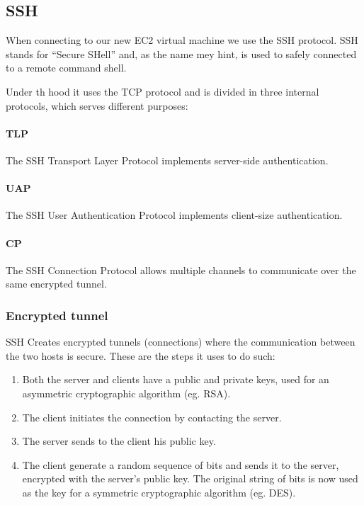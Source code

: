 \subsection{SSH}

When connecting to our new EC2 virtual machine we use the SSH protocol. SSH stands for ``Secure SHell'' and, as the name mey hint, is used to safely connected to a remote command shell.

Under th hood it uses the TCP protocol and is divided in three internal protocols, which serves different purposes:

\paragraph{TLP}
The SSH Transport Layer Protocol implements server-side authentication.

\paragraph{UAP}
The SSH User Authentication Protocol implements client-size authentication.

\paragraph{CP}
The SSH Connection Protocol allows multiple channels to communicate over the same
encrypted tunnel.

\subsubsection{Encrypted tunnel}
SSH Creates encrypted tunnels (connections) where the communication between the two hosts is secure. These are the steps it uses to do such:
\begin{enumerate}
    \item Both the server and clients have a public and private keys, used for an asymmetric cryptographic algorithm (eg. RSA).
    \item The client initiates the connection by contacting the server.
    \item The server sends to the client his public key.
    \item The client generate a random sequence of bits and sends it to the server, encrypted with the server's public key. The original string of bits is now used as the key for a symmetric cryptographic algorithm (eg. DES).
\end{enumerate}

